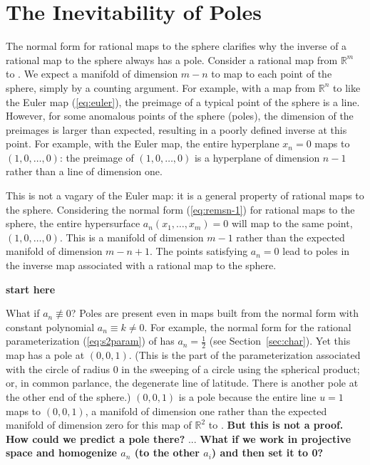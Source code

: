 \documentclass[12pt]{article}
\begin{document}


\section{The Inevitability of Poles}
\label{sec:pole}

The normal form for rational maps to the sphere clarifies why the inverse
of a rational map to the sphere always has a pole.
Consider a rational map from $\mathbb{R}^m$ to .
We expect a manifold of dimension $m-n$ to map to each point of the sphere,
simply by a counting argument.
For example, with a map from $\mathbb{R}^n$ to  like 
the Euler map (\ref{eq:euler}),
the preimage of a 
typical point of the sphere is a line.
However, for some anomalous points of the sphere (poles), 
the dimension of the preimages
is larger than expected, resulting in a poorly defined inverse at this point.
For example, with the Euler map,
the entire hyperplane $x_n=0$ maps to $(1,0,\ldots,0)$:
the preimage of $(1,0,\ldots,0)$ is a hyperplane of dimension $n-1$ 
rather than a line of dimension one.

This is not a vagary of the Euler map: it is a general property of
rational maps to the sphere.
Considering the normal form (\ref{eq:remsn-1}) for rational maps to the sphere,
the entire hypersurface $a_n(x_1,\ldots,x_m)=0$ will map to the same point,
$(1,0,\ldots,0)$.
This is a manifold of dimension $m-1$ rather than the expected manifold 
of dimension $m-n+1$.
The points satisfying $a_n = 0$ lead to poles in the inverse map 
associated with a rational map to the sphere.

{\bf start here}

What if $a_n \not\equiv 0$?
Poles %
are present even in maps built from the normal form 
with constant polynomial $a_n \equiv k \neq 0$.
For example, the normal form for the rational parameterization (\ref{eq:s2param})
of  has $a_n = \frac{1}{2}$ (see Section~\ref{sec:char}).
Yet this map has a pole at $(0,0,1)$.
(This is the part of the parameterization associated with the circle of radius 0 
in the sweeping of a circle using the spherical product;
or, in common parlance, the degenerate line of latitude.
There is another pole at the other end of the sphere.)
$(0,0,1)$ is a pole because the entire line $u=1$ maps to $(0,0,1)$,
a manifold of dimension one rather than the expected manifold of dimension zero 
for this map of $\mathbb{R}^2$ to .
{\bf But this is not a proof.  How could we predict a pole there?}
...
{\bf What if we work in projective space and homogenize $a_n$ (to the other $a_i$)
  and then set it to 0?}
\end{document}
